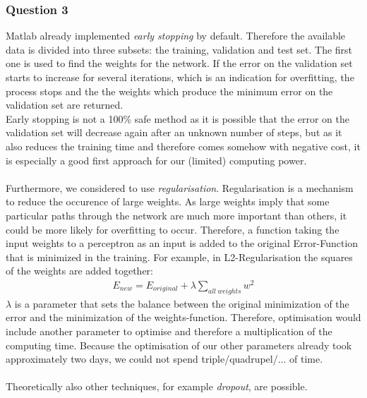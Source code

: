 \documentclass{article}
\begin{document}
\subsubsection*{Question 3}
Matlab already implemented \emph{early stopping} by default. Therefore the available data is divided into three subsets: the training, validation and test set. The first one is used to find the weights for the network. If the error on the validation set starts to increase for several iterations, which is an indication for overfitting, the process stops and the the weights which produce the minimum error on the validation set are returned.\\
Early stopping is not a 100\% safe method as it is possible that the error on the validation set will decrease again after an unknown number of steps, but as it also reduces the training time and therefore comes somehow with negative cost, it is especially a good first approach for our (limited) computing power.\\
\\
Furthermore, we considered to use \emph{regularisation}. Regularisation is a mechanism to reduce the occurence of large weights. As large weights imply that some particular paths through the network are much more important than others, it could be more likely for overfitting to occur. Therefore, a function taking the input weights to a perceptron as an input is added to the original Error-Function that is minimized in the training. For example, in L2-Regularisation the squares of the weights are added together:
\begin{align*}
    E_{new} = E_{original} + \lambda \sum \limits_{all\ weights} w^2
\end{align*}
$\lambda$ is a parameter that sets the balance between the original minimization of the error and the minimization of the weights-function. Therefore, optimisation would include another parameter to optimise and therefore a multiplication of the computing time. Because the optimisation of our other parameters already took approximately two days, we could not spend triple/quadrupel/... of time. \\
\\
Theoretically also other techniques, for example \emph{dropout}, are possible. 
\\
\end{document}
